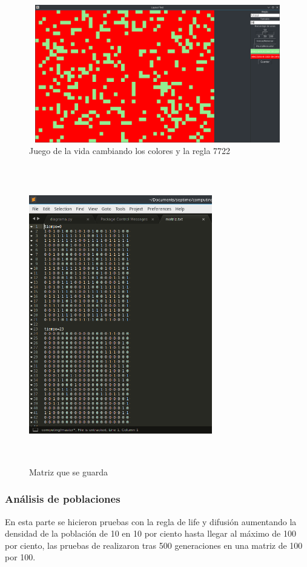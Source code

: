 \begin{figure}[H]
\begin{center}
 \includegraphics[width=13cm, height=6cm]{./img/gol_colores.png}
 \caption{Juego de la vida cambiando los colores y la regla 7722}
 \label{fig:gol_colores}
\end{center}
\end{figure}

\begin{figure}[H]
\begin{center}
 \includegraphics[width=8cm, height=13cm]{./img/matriz.png}
 \caption{Matriz que se guarda}
 \label{fig:matriz}
\end{center}
\end{figure}

\subsubsection{Análisis de poblaciones}
En esta parte se hicieron pruebas con la regla de life y difusión aumentando la densidad de la población de 10 en 10 por ciento hasta llegar al máximo de 100 por ciento, las pruebas de realizaron tras 500 generaciones en una matriz de 100 por 100.

